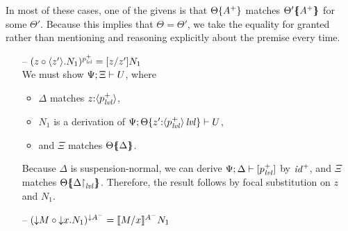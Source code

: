 In most of these cases, one of the givens is that
$\tackon{\Theta}{A^+}$ matches $\frameoff{\Theta'}{A^+}$ for some
$\Theta'$. Because this implies that $\Theta = \Theta'$, we take
the equality for granted rather than mentioning and 
reasoning explicitly about the premise every time.

\begin{itemize}
\item[--] $(\subst{z}{\tetap{z'}{N_1}})^{p^+_{\mlvl}} = [z/z']N_1$\smallskip\\
  We must show $\foc{\Psi}{\Xi}{U}$, where 
  \begin{itemize}
   \item $\Delta$ matches $z{:}\susp{p^+_\mlvl}$,
   \item 
      $N_1$ is a derivation of 
      $\foc{\Psi}{\tackon{\Theta}{z'{:}\islvl{\susp{p^+_\mlvl}}}}{U}$,
   \item and $\Xi$ matches $\frameoff{\Theta}{\Delta}$.
  \end{itemize}
  Because $\Delta$ is suspension-normal, 
  we can derive $\foc{\Psi}{\Delta}{[p^+_\mlvl]}$ by ${\it
    id}^+$, and
  $\Xi$ matches 
  $\frameoff{\Theta}{\restrictto{\Delta}{\mlvl}}$.
  Therefore, the result follows by focal substitution on $z$ and $N_1$. 

\smallskip
 
\item[--] $(\subst{\tdownr{M}}{\tdownl{x}{N_1}})^{{\downarrow}A^-} 
           = \rsubsta{M}{x}{N_1}{A^-}$ %




\end{itemize}
